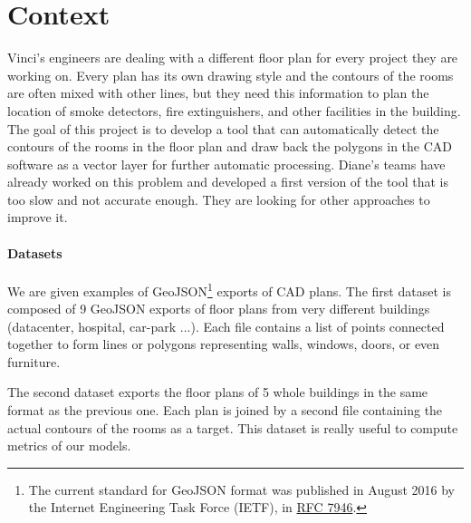 \documentclass[11pt]{article}
\begin{document}

\section{Context}
Vinci's engineers are dealing with a different floor plan for every project they are working on.
Every plan has its own drawing style and the contours of the rooms are often mixed with other
lines, but they need this information to plan the location of smoke detectors, fire extinguishers,
and other facilities in the building. The goal of this project is to develop a tool that can
automatically detect the contours of the rooms in the floor plan and draw back the polygons in the CAD software as 
a vector layer for further automatic processing. 
Diane's teams have already worked on this problem and developed a first version of the tool
that is too slow and not accurate enough. They are looking for other approaches
to improve it.

\paragraph{Datasets}
We are given examples of GeoJSON\footnote{The current standard for GeoJSON format was 
published in August 2016 by the Internet Engineering Task Force (IETF), 
in \href{https://datatracker.ietf.org/doc/html/rfc7946}{RFC 7946}.} exports of CAD plans. The first dataset is 
composed of 9 GeoJSON exports of floor plans from very different buildings (datacenter, 
hospital, car-park ...). Each file contains a list of points 
connected together to form lines or polygons representing walls, windows, doors, 
or even furniture.

The second dataset exports the floor plans of 5 whole buildings in the same format
as the previous one. Each plan is joined by a second file 
containing the actual contours of the rooms as a target. This dataset is really useful 
to compute metrics of our models.

\end{document}

